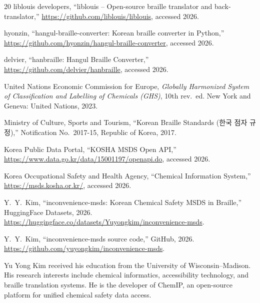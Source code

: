 \documentclass[journal]{IEEEtran}
\begin{document}
\begin{thebibliography}{20}
liblouis developers, ``liblouis -- Open-source braille translator and back-translator,'' \url{https://github.com/liblouis/liblouis}, accessed 2026.

hyonzin, ``hangul-braille-converter: Korean braille converter in Python,'' \url{https://github.com/hyonzin/hangul-braille-converter}, accessed 2026.

delvier, ``hanbraille: Hangul Braille Converter,'' \url{https://github.com/delvier/hanbraille}, accessed 2026.

United Nations Economic Commission for Europe, \emph{Globally Harmonized System of Classification and Labelling of Chemicals (GHS)}, 10th rev.~ed. New York and Geneva: United Nations, 2023.

Ministry of Culture, Sports and Tourism, ``Korean Braille Standards (한국 점자 규정),'' Notification No.~2017-15, Republic of Korea, 2017.

Korea Public Data Portal, ``KOSHA MSDS Open API,'' \url{https://www.data.go.kr/data/15001197/openapi.do}, accessed 2026.

Korea Occupational Safety and Health Agency, ``Chemical Information System,'' \url{https://msds.kosha.or.kr/}, accessed 2026.

Y.~Y.~Kim, ``inconvenience-msds: Korean Chemical Safety MSDS in Braille,'' HuggingFace Datasets, 2026. \url{https://huggingface.co/datasets/Yuyongkim/inconvenience-msds}.

Y.~Y.~Kim, ``inconvenience-msds source code,'' GitHub, 2026. \url{https://github.com/yuyongkim/inconvenience-msds}.

\end{thebibliography}

\begin{IEEEbiography}[]{Yu Yong Kim}
received his education from the University of Wisconsin--Madison. His research interests include chemical informatics, accessibility technology, and braille translation systems. He is the developer of ChemIP, an open-source platform for unified chemical safety data access.
\end{IEEEbiography}
\end{document}
